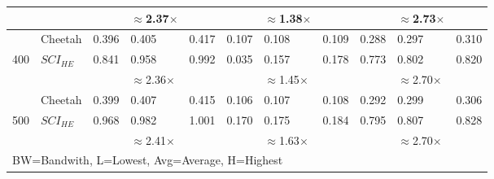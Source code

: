 \begin{tabular}{lllllllllll}
           &         &        & $\approx$2.37$\times$    &       &               & $\approx$1.38$\times$           &               &               & $\approx$2.73$\times$           &               \\ \hline
           & Cheetah & 0.396  & 0.405    & 0.417 & 0.107         & 0.108           & 0.109         & 0.288         & 0.297           & 0.310         \\
400        & $SCI_{HE}$ & 0.841  & 0.958    & 0.992 & 0.035         & 0.157           & 0.178         & 0.773         & 0.802           & 0.820         \\ \cline{3-11} 
           &         &        & $\approx$2.36$\times$    &       &               & $\approx$1.45$\times$           &               &               & $\approx$2.70$\times$           &               \\ \hline
           & Cheetah & 0.399  & 0.407    & 0.415 & 0.106         & 0.107           & 0.108         & 0.292         & 0.299           & 0.306         \\
500        & $SCI_{HE}$ & 0.968  & 0.982    & 1.001 & 0.170         & 0.175           & 0.184         & 0.795         & 0.807           & 0.828         \\ \cline{2-11} 
           &         &        & $\approx$2.41$\times$    &       &               & $\approx$1.63$\times$           &               &               & $\approx$2.70$\times$           &               \\ \hline
\multicolumn{11}{l}{BW=Bandwith, L=Lowest, Avg=Average, H=Highest}                                                                                  
\end{tabular}

